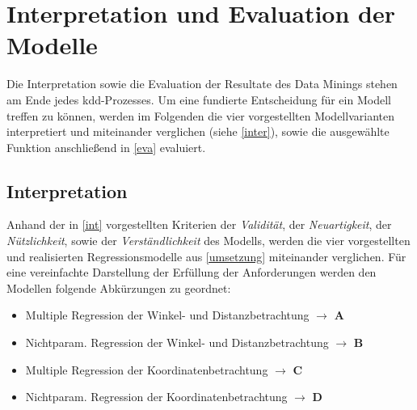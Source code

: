 \section{Interpretation und Evaluation der Modelle}
\label{iue}
Die Interpretation sowie die Evaluation der Resultate des Data Minings stehen am Ende jedes \gls{kdd}-Prozesses. Um eine fundierte Entscheidung für ein Modell treffen zu können, werden im Folgenden die vier vorgestellten Modellvarianten interpretiert und miteinander verglichen (siehe \vref{inter}), sowie die ausgewählte Funktion anschließend in \vref{eva} evaluiert.

\subsection{Interpretation}
\label{inter}
Anhand der in \vref{int} vorgestellten Kriterien der \textit{Validität}, der \textit{Neuartigkeit}, der \textit{Nützlichkeit}, sowie der \textit{Verständlichkeit} des Modells, werden die vier vorgestellten und realisierten Regressionsmodelle aus \vref{umsetzung} miteinander verglichen. Für eine vereinfachte Darstellung der Erfüllung der Anforderungen werden den Modellen folgende Abkürzungen zu geordnet:

\begin{itemize}
\item Multiple Regression der Winkel- und Distanzbetrachtung $\rightarrow$ \textbf{A}
\item Nichtparam. Regression der Winkel- und Distanzbetrachtung $\rightarrow$ \textbf{B}
\item Multiple Regression der Koordinatenbetrachtung $\rightarrow$ \textbf{C}
\item Nichtparam. Regression der Koordinatenbetrachtung $\rightarrow$ \textbf{D}
\end{itemize}

